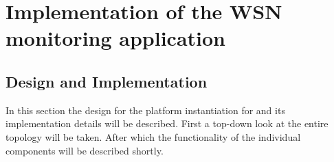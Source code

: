 




	
\section{Implementation of the WSN monitoring application}
\subsection{Design and Implementation}
In this section the design for the platform instantiation for \nedap \sensit and its implementation details will be described. First a top-down look at the entire topology will be taken. After which the functionality of the individual components will be described shortly.

